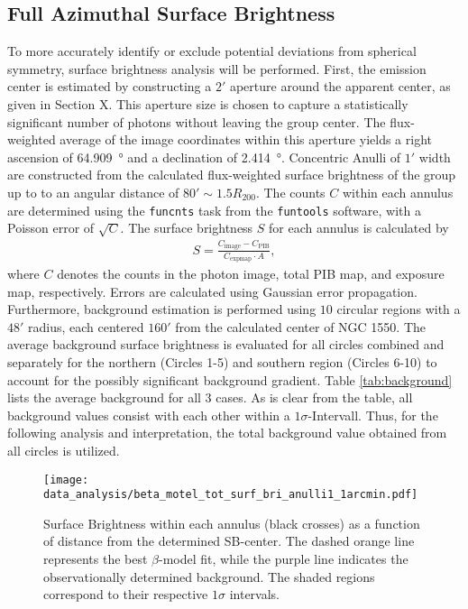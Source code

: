 \subsection{Full Azimuthal Surface Brightness}
To more accurately identify or exclude potential deviations from spherical symmetry, surface brightness analysis will be performed. First, the emission center is estimated by constructing a \(2'\) aperture around the apparent center, as given in Section X. This aperture size is chosen to capture a statistically significant number of photons without leaving the group center. The flux-weighted average of the image coordinates within this aperture yields a right ascension of \SI{64.909}{\degree} and a declination of \SI{2.414}{\degree}. Concentric Anulli of \(1'\) width are constructed from the calculated flux-weighted surface brightness of the group up to to an angular distance of \(80' \sim 1.5R_{200}\). The counts \(C\) within each annulus are determined using the \texttt{funcnts} task from the \texttt{funtools} software, with a Poisson error of \(\sqrt{C}\). The surface brightness \(S\) for each annulus is calculated by
\begin{align*}
    S = \frac{C_\text{image} - C_\text{PIB}}{C_\text{expmap}\cdot A},
\end{align*}
where \(C\) denotes the counts in the photon image, total PIB map, and exposure map, respectively. Errors are calculated using Gaussian error propagation. Furthermore, background estimation is performed using \(10\) circular regions with a \(48'\) radius, each centered \(160'\) from the calculated center of NGC 1550. The average background surface brightness is evaluated for all circles combined and separately for the northern (Circles 1-5) and southern region (Circles 6-10) to account for the possibly significant background gradient. Table \ref{tab:background} lists the average background for all 3 cases. As is clear from the table, all background values consist with each other within a \(1\sigma\)-Intervall. Thus, for the following analysis and interpretation, the total background value obtained from all circles is utilized. 
\begin{figure}[htbp]
    \centering
    \texttt{[image: data\_analysis/beta\_motel\_tot\_surf\_bri\_anulli1\_1arcmin.pdf]}
    \caption{Surface Brightness within each annulus (black crosses) as a function of distance from the determined SB-center. The dashed orange line represents the best \(\beta\)-model fit, while the purple line indicates the observationally determined background. The shaded regions correspond to their respective \(1\sigma\) intervals.}
    \label{fig:tot_azimuthal_beta_model}
\end{figure}
